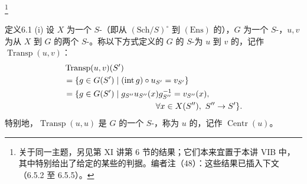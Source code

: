 \footnote{关于同一主题，另见第 XI 讲第 6 节的结果；它们本来宜置于本讲 VIB 中，其中特别给出了给定的某些的判据。编者注（48）：这些结果已插入下文（6.5.2 至 6.5.5）。}
\begin{SGAresult}{定义}{6.1}
(i) 设 $X$ 为一个 $S$-（即从 $(\mathrm{Sch}/S)^\circ$ 到 $(\mathrm{Ens})$ 的），$G$ 为一个 $S$-，$u,v$ 为从 $X$ 到 $G$ 的两个 $S$-。称以下方式定义的 $G$ 的 $S$-为 $u$ 到 $v$ 的，记作 $\operatorname{Transp}(u,v)$：
\[
\begin{aligned}
{}&\operatorname{Transp}(u,v)(S')\\
{}&=\{g\in G(S')\mid (\operatorname{int}g)\circ u_{S'}=v_{S'}\}\\
{}&=\{g\in G(S')\mid g_{S''}u_{S''}(x)g_{S''}^{-1}=v_{S''}(x),\\
{}&\hspace{39mm}\forall x\in X(S''),\ S''\to S'\}.
\end{aligned}
\]
特别地，$\operatorname{Transp}(u,u)$ 是 $G$ 的一个 $S$-，称为 $u$ 的，记作 $\operatorname{Centr}(u)$。


\end{SGAresult}
